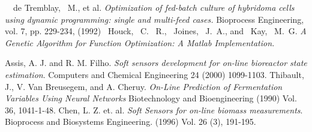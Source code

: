 \documentclass[10pt]{article}
\begin{document}
\begin{thebibliography}{9}

 ~~de Tremblay, ~M., et al. \emph{Optimization of fed-batch culture of hybridoma cells using dynamic programming: single and multi-feed cases.} Bioprocess Engineering, vol. 7, pp. 229-234, (1992)
 ~Houck, ~C. ~R., ~Joines, ~J.~A., and ~Kay, ~M.~G. \emph{A Genetic Algorithm for Function Optimization: A Matlab Implementation.}

 Assis, A. J. and R. M. Filho. \emph{Soft sensors development for on-line bioreactor state estimation}. Computers and Chemical Engineering 24 (2000) 1099-1103.
 Thibault, J., V. Van Breusegem, and A. Cheruy. \emph{On-Line Prediction of Fermentation Variables Using Neural Networks} Biotechnology and Bioengineering (1990) Vol. 36, 1041-1-48.
 Chen, L. Z. et. al. \emph{Soft Sensors for on-line biomass measurements}. Bioprocess and Biosystems Engineering. (1996) Vol. 26 (3), 191-195.

\end{thebibliography}
\end{document}
